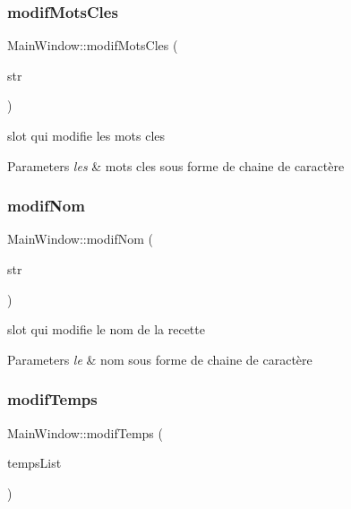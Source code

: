 \subsubsection{\texorpdfstring{modif\+Mots\+Cles}{modifMotsCles}}
{\footnotesize\ttfamily Main\+Window\+::modif\+Mots\+Cles (\begin{DoxyParamCaption}\item[{Q\+String}]{str }\end{DoxyParamCaption})\hspace{0.3cm}{\ttfamily [slot]}}



slot qui modifie les mots cles 


\begin{DoxyParams}{Parameters}
{\em les} & mots cles sous forme de chaine de caractère \\
\hline
\end{DoxyParams}
\mbox{\label{classMainWindow_ac154b320efe8998a85a93f1c41ace7e4}} 
\subsubsection{\texorpdfstring{modif\+Nom}{modifNom}}
{\footnotesize\ttfamily Main\+Window\+::modif\+Nom (\begin{DoxyParamCaption}\item[{Q\+String}]{str }\end{DoxyParamCaption})\hspace{0.3cm}{\ttfamily [slot]}}



slot qui modifie le nom de la recette 


\begin{DoxyParams}{Parameters}
{\em le} & nom sous forme de chaine de caractère \\
\hline
\end{DoxyParams}
\mbox{\label{classMainWindow_aa1a396598453cdc0c4571dda33504098}} 
\subsubsection{\texorpdfstring{modif\+Temps}{modifTemps}}
{\footnotesize\ttfamily Main\+Window\+::modif\+Temps (\begin{DoxyParamCaption}\item[{Q\+String\+List}]{temps\+List }\end{DoxyParamCaption})\hspace{0.3cm}{\ttfamily [slot]}}



